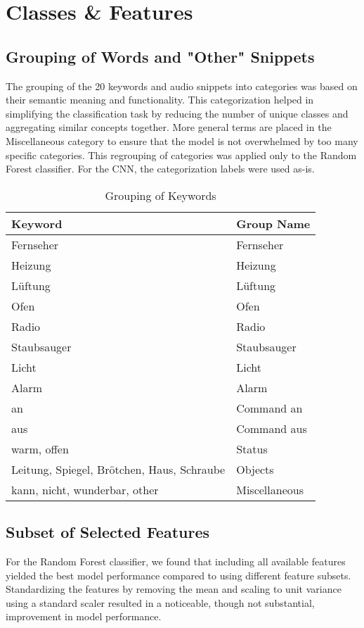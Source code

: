 \section{Classes \& Features}

\subsection{Grouping of Words and "Other" Snippets}
The grouping of the 20 keywords and audio snippets into categories was based on their semantic meaning and functionality. This categorization helped in simplifying the classification task by reducing the number of unique classes and aggregating similar concepts together. More general terms are placed in the Miscellaneous category to ensure that the model is not overwhelmed by too many specific categories. This regrouping of categories was applied only to the Random Forest classifier. For the CNN, the categorization labels were used as-is.

\begin{table}
  \caption{Grouping of Keywords}
  \label{tab:keyword_grouping}
  \centering
  \begin{tabular}{ll}
    \toprule
    Keyword & Group Name \\
    \midrule
    Fernseher & Fernseher \\
    Heizung & Heizung \\
    Lüftung & Lüftung \\
    Ofen & Ofen \\
    Radio & Radio \\
    Staubsauger & Staubsauger \\
    Licht & Licht \\
    Alarm & Alarm \\
    an & Command an \\
    aus & Command aus \\
    warm, offen & Status \\
    Leitung, Spiegel, Brötchen, Haus, Schraube & Objects \\
    kann, nicht, wunderbar, other & Miscellaneous \\
    \bottomrule
  \end{tabular}
\end{table}

\subsection{Subset of Selected Features}
For the Random Forest classifier, we found that including all available features yielded the best model performance compared to using different feature subsets. Standardizing the features by removing the mean and scaling to unit variance using a standard scaler resulted in a noticeable, though not substantial, improvement in model performance.

